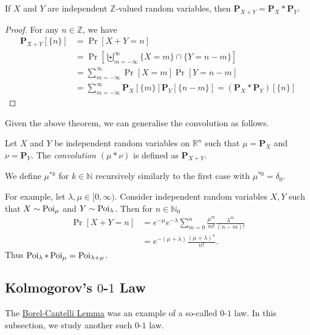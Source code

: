 \begin{theorem}
    If $X$ and $Y$ are independent $\mathbb{Z}$-valued random variables, then $\textbf{P}_{X+Y}=\textbf{P}_X * \textbf{P}_Y$.
\end{theorem}
\begin{proof}
    For any $n\in\mathbb{Z}$, we have
    \begin{align*}
        \textbf{P}_{X+Y}[\{n\}] &= \Pr[X+Y=n] \\
        &= \Pr\left[\biguplus_{m=-\infty}^\infty \{X=m\}\cap\{Y=n-m\}\right] \\
        &= \sum_{m=-\infty}^\infty \Pr[X=m]\Pr[Y=n-m] \\
        &= \sum_{m=-\infty}^\infty \textbf{P}_X[\{m\}]\textbf{P}_Y[\{n-m\}] = (\textbf{P}_X * \textbf{P}_Y) [\{n\}]
    \end{align*}
\end{proof}

Given the above theorem, we can generalise the convolution as follows.

\begin{definition}
    Let $X$ and $Y$ be independent random variables on $\mathbb{R}^n$ such that $\mu=\textbf{P}_X$ and $\nu=\textbf{P}_Y$. The \textit{convolution $(\mu * \nu)$} is defined as $\textbf{P}_{X+Y}$.
\end{definition}

We define $\mu^{*k}$ for $k\in\mathbb{N}$ recursively similarly to the first case with $\mu^{*0}=\delta_0$.

\vspace{2mm}
For example, let $\lambda,\mu\in[0,\infty)$. Consider independent random variables $X,Y$ such that $X\sim\operatorname{Poi}_\mu$ and $Y\sim\operatorname{Poi}_\lambda$. Then for $n\in\mathbb{N}_0$
\begin{align*}
    \Pr[X+Y=n] &= e^{-\mu}e^{-\lambda}\sum_{m=0}^n \frac{\mu^m}{m!}\frac{\lambda^m}{(n-m)!} \\
    &= e^{-(\mu+\lambda)}\frac{(\mu+\lambda)^n}{n!}.
\end{align*}
Thus $\operatorname{Poi}_\lambda * \operatorname{Poi}_\mu = \operatorname{Poi}_{\lambda+\mu}$.

\subsection{Kolmogorov's \texorpdfstring{$0$}{TEXT}-\texorpdfstring{$1$}{TEXT} Law}

The \hyperref[borelCantelliLemma]{Borel-Cantelli Lemma} was an example of a so-called $0$-$1$ law. In this subsection, we study another such $0$-$1$ law.

